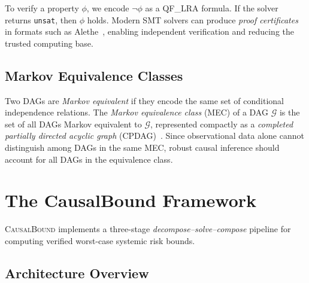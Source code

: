\documentclass[11pt,a4paper]{article}
\newcommand{\calG}{\mathcal{G}}
\newcommand{\CausalBound}{\textsc{CausalBound}}
\begin{document}
To verify a property $\phi$, we encode $\neg \phi$ as a QF\_LRA formula. If the solver returns \texttt{unsat}, then $\phi$ holds. Modern SMT solvers can produce \emph{proof certificates} in formats such as Alethe~\citep{schurr2021alethe}, enabling independent verification and reducing the trusted computing base.

\subsection{Markov Equivalence Classes}
\label{sec:bg-mec}

Two DAGs are \emph{Markov equivalent} if they encode the same set of conditional independence relations. The \emph{Markov equivalence class} (MEC) of a DAG $\calG$ is the set of all DAGs Markov equivalent to $\calG$, represented compactly as a \emph{completed partially directed acyclic graph} (CPDAG)~\citep{maathuis2009estimating}. Since observational data alone cannot distinguish among DAGs in the same MEC, robust causal inference should account for all DAGs in the equivalence class.

\section{The CausalBound Framework}
\label{sec:framework}

\CausalBound{} implements a three-stage \emph{decompose--solve--compose} pipeline for computing verified worst-case systemic risk bounds.

\subsection{Architecture Overview}
\label{sec:arch}
\end{document}
